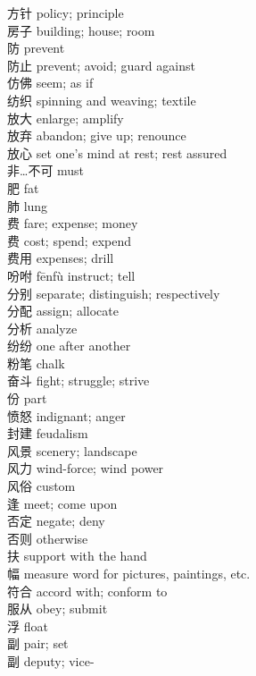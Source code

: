 方针 \quad policy; principle\\
房子 \quad building; house; room\\
防 \quad prevent\\
防止 \quad prevent; avoid; guard against\\
仿佛 \quad seem; as if\\
纺织 \quad spinning and weaving; textile\\
放大 \quad enlarge; amplify\\
放弃 \quad abandon; give up; renounce\\
放心 \quad set one's mind at rest; rest assured\\
非…不可 \quad must\\
肥 \quad fat\\
肺 \quad lung\\
费 \quad fare; expense; money\\
费 \quad cost; spend; expend\\
费用 \quad expenses; drill\\
吩咐 \quad fēnfù \quad instruct; tell\\
分别 \quad separate; distinguish; respectively\\
分配 \quad assign; allocate\\
分析 \quad analyze\\
纷纷 \quad one after another\\
粉笔 \quad chalk\\
奋斗 \quad fight; struggle; strive\\
份 \quad part\\
愤怒 \quad indignant; anger\\
封建 \quad feudalism\\
风景 \quad scenery; landscape\\
风力 \quad wind-force; wind power\\
风俗 \quad custom\\
逢 \quad meet; come upon\\
否定 \quad negate; deny\\
否则 \quad otherwise\\
扶 \quad support with the hand\\
幅 \quad measure word for pictures, paintings, etc.\\
符合 \quad accord with; conform to\\
服从 \quad obey; submit\\
浮 \quad float\\
副 \quad pair; set\\
副 \quad deputy; vice-\\
